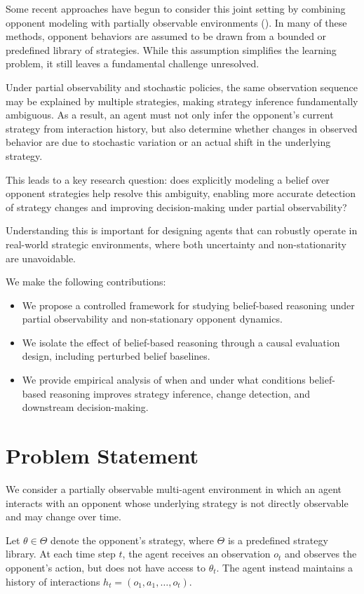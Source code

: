 \documentclass{article}
\begin{document}
Some recent approaches have begun to consider this joint setting by combining opponent modeling with partially observable environments (\cite{zheng2018deep, wang2022bayesian, davies2020opponent}). In many of these methods, opponent behaviors are assumed to be drawn from a bounded or predefined library of strategies. While this assumption simplifies the learning problem, it still leaves a fundamental challenge unresolved.

Under partial observability and stochastic policies, the same observation sequence may be explained by multiple strategies, making strategy inference fundamentally ambiguous. As a result, an agent must not only infer the opponent’s current strategy from interaction history, but also determine whether changes in observed behavior are due to stochastic variation or an actual shift in the underlying strategy.

This leads to a key research question: does explicitly modeling a belief over opponent strategies help resolve this ambiguity, enabling more accurate detection of strategy changes and improving decision-making under partial observability?

Understanding this is important for designing agents that can robustly operate in real-world strategic environments, where both uncertainty and non-stationarity are unavoidable.

We make the following contributions:
\begin{itemize}
    \item We propose a controlled framework for studying belief-based reasoning under partial observability and non-stationary opponent dynamics.
    \item We isolate the effect of belief-based reasoning through a causal evaluation design, including perturbed belief baselines.
    \item We provide empirical analysis of when and under what conditions belief-based reasoning improves strategy inference, change detection, and downstream decision-making.
\end{itemize}


\section{Problem Statement}
We consider a partially observable multi-agent environment in which an agent interacts with an opponent whose underlying strategy is not directly observable and may change over time.

Let $\theta \in \Theta$ denote the opponent’s strategy, where $\Theta$ is a predefined strategy library. At each time step $t$, the agent receives an observation $o_t$ and observes the opponent’s action, but does not have access to $\theta_t$. The agent instead maintains a history of interactions $h_t = (o_1, a_1, \dots, o_t)$.
\end{document}
